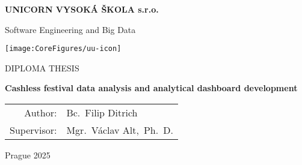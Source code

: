 \pagestyle{empty}
\begin{center}

{\bfseries\large UNICORN VYSOKÁ ŠKOLA s.r.o.}

	\vspace{5mm}

	{\Large Software Engineering and Big Data}

	\vfill
	\vspace{5mm}

	\centerline{\mbox{\texttt{[image: \\CoreFigures/uu-icon]}}}

	\vfill
	\vspace{5mm}

	{\large\MakeUppercase{Diploma Thesis}}

	\vspace{15mm}

	{\LARGE\bfseries Cashless festival data analysis and analytical dashboard development}

	\vfill

	\begin{tabular}{rl}
		Author:     & Bc.~Filip Ditrich       \\
		\noalign{\vspace{2mm}}
		Supervisor: & Mgr.~Václav Alt,~Ph.~D. \\
	\end{tabular}

	\vfill

	Prague 2025

\end{center}
